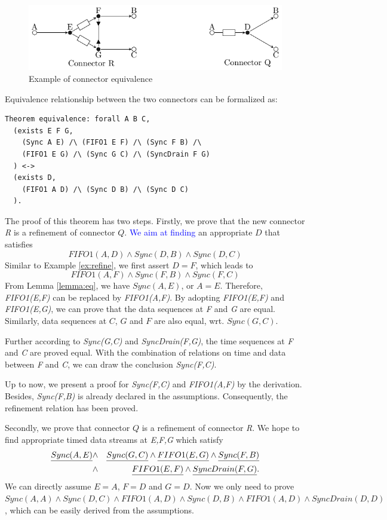\documentclass[preprint,3p]{elsarticle}
\newcommand{\liyi}[1]{\textcolor{blue}{#1}}
\begin{document}
\begin{figure}[htb]
\vspace{0cm}
\centering
\includegraphics[width=.7\textwidth]{equivalence.pdf}
\caption{Example of connector equivalence}
\label{refine1}

\end{figure}

Equivalence relationship between the two connectors can be formalized as:
\begin{lstlisting}[language=coq]
Theorem equivalence: forall A B C,
  (exists E F G,
    (Sync A E) /\ (FIFO1 E F) /\ (Sync F B) /\
    (FIFO1 E G) /\ (Sync G C) /\ (SyncDrain F G)
  ) <->
  (exists D,
    (FIFO1 A D) /\ (Sync D B) /\ (Sync D C)
  ).
\end{lstlisting}
The proof of this theorem has two steps. Firstly, we prove that the new connector \emph{R} is a refinement of connector $Q$.
\liyi{We aim at finding} an appropriate \emph{$D$} that satisfies
\[
FIFO1(A,D)\wedge Sync(D,B) \wedge Sync(D,C)
\]
Similar to Example \ref{ex:refine}, we first assert $D=F$, which leads to
\[
FIFO1(A,F) \land Sync(F,B) \wedge Sync(F,C)
\]
From Lemma \ref{lemma:eq}, we have $Sync(A,E)$, or $A=E$. Therefore, \emph{FIFO1(E,F)} can be replaced by \emph{FIFO1(A,F)}. By adopting \emph{FIFO1(E,F)} and \emph{FIFO1(E,G)}, we can prove that the data sequences at \emph{F} and \emph{G} are equal. Similarly, data sequences at $C$, $G$ and $F$ are also equal, wrt. $Sync(G,C)$.

Further according to \emph{Sync(G,C)} and \emph{SyncDrain(F,G)}, the time sequences at \emph{F} and \emph{C} are proved equal. With the combination of relations on time and data between \emph{F} and \emph{C}, we can draw the conclusion \emph{Sync(F,C)}.


Up to now, we present a proof for \emph{Sync(F,C)} and \emph{FIFO1(A,F)} by the derivation. Besides, \emph{Sync(F,B)} is already declared in the assumptions. Consequently, the refinement relation has been proved.

Secondly, we prove that connector $Q$ is a refinement of connector \emph{R}.
We hope to find appropriate timed data streams at \emph{E,F,G}  which satisfy
\begin{eqnarray*}
\emph{Sync(A,E)}&\wedge& \emph{Sync(G,C)} \wedge \emph{FIFO1(E,G)}\wedge \emph{Sync(F,B)}\\
 &\wedge& \emph{FIFO1(E,F)}\wedge \emph{SyncDrain(F,G)}.
\end{eqnarray*}
We can directly assume $E=A$, $F=D$ and $G=D$. Now we only need to prove
$Sync(A,A) \wedge  Sync(D,C)  \wedge  FIFO1(A,D) \wedge  Sync(D,B) \wedge FIFO1(A,D) \wedge SyncDrain(D,D)$, which can be easily derived from the assumptions.
\end{document}
